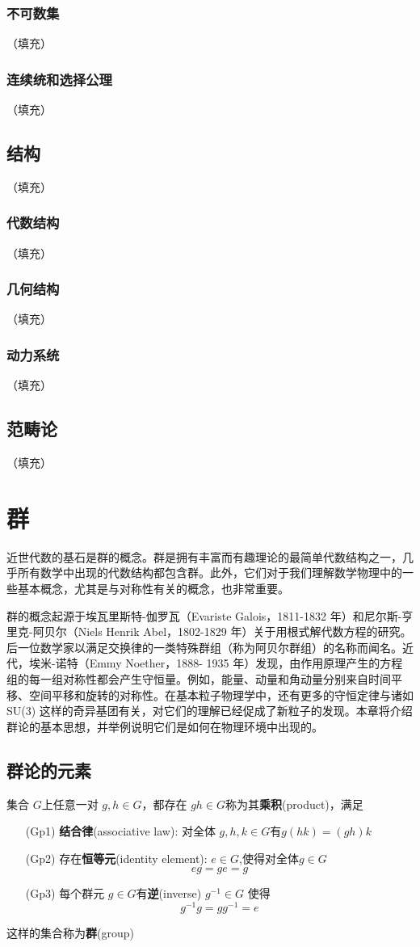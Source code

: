 \documentclass[hyperref,UTF8]{ctexbook}
\begin{document}
\subsection{不可数集}（填充）
\subsection{连续统和选择公理}（填充）
\section{结构}（填充）
\subsection{代数结构}（填充）
\subsection{几何结构}（填充）
\subsection{动力系统}（填充）
\section{范畴论}（填充）
\chapter{群}
近世代数的基石是群的概念。群是拥有丰富而有趣理论的最简单代数结构之一，几乎所有数学中出现的代数结构都包含群。此外，它们对于我们理解数学物理中的一些基本概念，尤其是与对称性有关的概念，也非常重要。

群的概念起源于埃瓦里斯特-伽罗瓦（Evariste Galois，1811-1832 年）和尼尔斯-亨里克-阿贝尔（Niels Henrik Abel，1802-1829 年）关于用根式解代数方程的研究。后一位数学家以满足交换律的一类特殊群组（称为阿贝尔群组）的名称而闻名。近代，埃米-诺特（Emmy Noether，1888- 1935 年）发现，由作用原理产生的方程组的每一组对称性都会产生守恒量。例如，能量、动量和角动量分别来自时间平移、空间平移和旋转的对称性。在基本粒子物理学中，还有更多的守恒定律与诸如 SU(3) 这样的奇异基团有关，对它们的理解已经促成了新粒子的发现。本章将介绍群论的基本思想，并举例说明它们是如何在物理环境中出现的。
\section{群论的元素}\label{sec:2.1}
集合 $G$上任意一对 $g,h\in G$，都存在 $gh\in G$称为其\textbf{乘积}(product)，满足
\begin{enumerate}
    \item[(Gp1)]\label{gp:1}
    \textbf{结合律}(associative law): 对全体 $g,h,k\in G$有$g(hk)=(gh)k$  
    \item[(Gp2)] \label{gp:2}
    存在\textbf{恒等元}(identity element): $e\in G$,使得对全体\(g\in G\)
    \[eg=ge=g\]
    \item[(Gp3)] \label{gp:3}
    每个群元 $g\in G$有\textbf{逆}(inverse) $g^{-1}\in G$ 使得\[g^{-1}g=gg^{-1}=e\] 
\end{enumerate}
这样的集合称为\textbf{群}(group)
\end{document}
